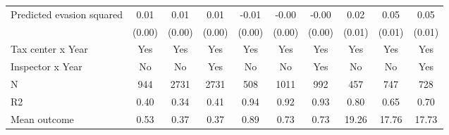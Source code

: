 \begin{tabular}{lccc|ccc|ccc}
\addlinespace
Predicted evasion squared&        0.01\sym{***}&        0.01\sym{***}&        0.01\sym{***}&       -0.01\sym{***}&       -0.00\sym{***}&       -0.00\sym{***}&        0.02\sym{*}  &        0.05\sym{***}&        0.05\sym{***}\\
            &      (0.00)         &      (0.00)         &      (0.00)         &      (0.00)         &      (0.00)         &      (0.00)         &      (0.01)         &      (0.01)         &      (0.01)         \\
\midrule
Tax center x Year&         Yes         &         Yes         &         Yes         &         Yes         &         Yes         &         Yes         &         Yes         &         Yes         &         Yes         \\
Inspector x Year&          No         &          No         &         Yes         &          No         &          No         &         Yes         &          No         &          No         &         Yes         \\
N           &         944         &        2731         &        2731         &         508         &        1011         &         992         &         457         &         747         &         728         \\
R2          &        0.40         &        0.34         &        0.41         &        0.94         &        0.92         &        0.93         &        0.80         &        0.65         &        0.70         \\
Mean outcome&        0.53         &        0.37         &        0.37         &        0.89         &        0.73         &        0.73         &       19.26         &       17.76         &       17.73         \\
\bottomrule \end{tabular}
